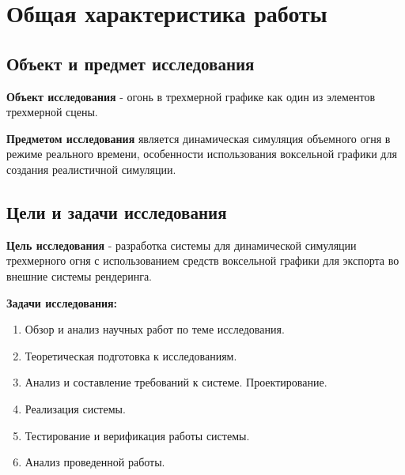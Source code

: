 \section{Общая характеристика работы}

\subsection{Объект и предмет исследования}

\textbf{Объект исследования} - огонь в трехмерной графике как один из элементов
трехмерной сцены.

\textbf{Предметом исследования} является динамическая симуляция объемного огня в
режиме реального времени, особенности использования воксельной графики для
создания реалистичной симуляции.

\subsection{Цели и задачи исследования}

\textbf{Цель исследования} - разработка системы для динамической симуляции
трехмерного огня с использованием средств воксельной графики для экспорта во
внешние системы рендеринга.

\textbf{Задачи исследования:}

\begin{enumerate}
	\item Обзор и анализ научных работ по теме исследования.
	\item Теоретическая подготовка к исследованиям.
	\item Анализ и составление требований к системе. Проектирование.
	\item Реализация системы.
	\item Тестирование и верификация работы системы.
	\item Анализ проведенной работы.
\end{enumerate}
